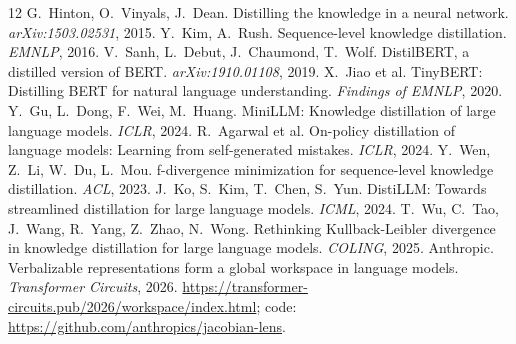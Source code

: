 \documentclass[11pt]{article}
\begin{document}
\begin{thebibliography}{12}
 G.~Hinton, O.~Vinyals, J.~Dean.
Distilling the knowledge in a neural network. \emph{arXiv:1503.02531}, 2015.
 Y.~Kim, A.~Rush. Sequence-level knowledge
distillation. \emph{EMNLP}, 2016.
 V.~Sanh, L.~Debut, J.~Chaumond, T.~Wolf.
DistilBERT, a distilled version of BERT. \emph{arXiv:1910.01108}, 2019.
 X.~Jiao et al. TinyBERT: Distilling BERT for
natural language understanding. \emph{Findings of EMNLP}, 2020.
 Y.~Gu, L.~Dong, F.~Wei, M.~Huang. MiniLLM:
Knowledge distillation of large language models. \emph{ICLR}, 2024.
 R.~Agarwal et al. On-policy distillation of
language models: Learning from self-generated mistakes. \emph{ICLR}, 2024.
 Y.~Wen, Z.~Li, W.~Du, L.~Mou. f-divergence
minimization for sequence-level knowledge distillation. \emph{ACL}, 2023.
 J.~Ko, S.~Kim, T.~Chen, S.~Yun. DistiLLM:
Towards streamlined distillation for large language models. \emph{ICML},
2024.
 T.~Wu, C.~Tao, J.~Wang, R.~Yang, Z.~Zhao,
N.~Wong. Rethinking Kullback-Leibler divergence in knowledge distillation
for large language models. \emph{COLING}, 2025.
 Anthropic. Verbalizable representations
form a global workspace in language models. \emph{Transformer Circuits},
2026. \url{https://transformer-circuits.pub/2026/workspace/index.html};
code: \url{https://github.com/anthropics/jacobian-lens}.
\end{thebibliography}
\end{document}
